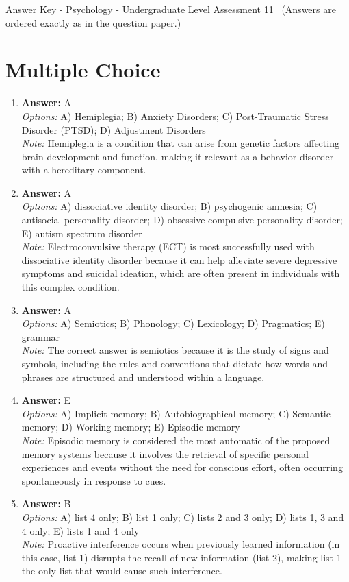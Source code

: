 \documentclass[12pt]{article}
\begin{document}
\begin{center}
Answer Key - Psychology - Undergraduate Level Assessment 11 \
\small (Answers are ordered exactly as in the question paper.)
\end{center}

\section*{Multiple Choice}
\begin{enumerate}[label=\arabic*.]
\item \textbf{Answer:} A
\\ \textit{Options:} A) Hemiplegia; B) Anxiety Disorders; C) Post-Traumatic Stress Disorder (PTSD); D) Adjustment Disorders
\\ \textit{Note:} Hemiplegia is a condition that can arise from genetic factors affecting brain development and function, making it relevant as a behavior disorder with a hereditary component.
\item \textbf{Answer:} A
\\ \textit{Options:} A) dissociative identity disorder; B) psychogenic amnesia; C) antisocial personality disorder; D) obsessive-compulsive personality disorder; E) autism spectrum disorder
\\ \textit{Note:} Electroconvulsive therapy (ECT) is most successfully used with dissociative identity disorder because it can help alleviate severe depressive symptoms and suicidal ideation, which are often present in individuals with this complex condition.
\item \textbf{Answer:} A
\\ \textit{Options:} A) Semiotics; B) Phonology; C) Lexicology; D) Pragmatics; E) grammar
\\ \textit{Note:} The correct answer is semiotics because it is the study of signs and symbols, including the rules and conventions that dictate how words and phrases are structured and understood within a language.
\item \textbf{Answer:} E
\\ \textit{Options:} A) Implicit memory; B) Autobiographical memory; C) Semantic memory; D) Working memory; E) Episodic memory
\\ \textit{Note:} Episodic memory is considered the most automatic of the proposed memory systems because it involves the retrieval of specific personal experiences and events without the need for conscious effort, often occurring spontaneously in response to cues.
\item \textbf{Answer:} B
\\ \textit{Options:} A) list 4 only; B) list 1 only; C) lists 2 and 3 only; D) lists 1, 3 and 4 only; E) lists 1 and 4 only
\\ \textit{Note:} Proactive interference occurs when previously learned information (in this case, list 1) disrupts the recall of new information (list 2), making list 1 the only list that would cause such interference.
\end{enumerate}
\end{document}
